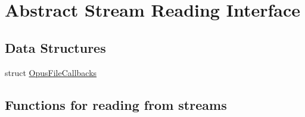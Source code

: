 \hypertarget{group__stream__callbacks}{}\section{Abstract Stream Reading Interface}
\label{group__stream__callbacks}
\subsection*{Data Structures}
\begin{DoxyCompactItemize}
\item 
struct \hyperlink{struct_opus_file_callbacks}{Opus\+File\+Callbacks}
\end{DoxyCompactItemize}
\subsection*{Functions for reading from streams}
\label{_amgrpd4385b08c3c11bcaad7ac9c007fab1ca}%
